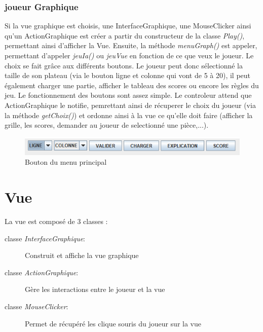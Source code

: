         \subsubsection{joueur Graphique}
        Si la vue graphique est choisis, une InterfaceGraphique, une MouseClicker ainsi qu'un ActionGraphique est créer a partir du constructeur de la classe \textit{Play()}, permettant ainsi d'afficher la Vue. Ensuite, la méthode \textit{menuGraph()} est appeler, permettant d'appeler \textit{jeuIa()} ou \textit{jeuVue} en fonction de ce que veux le joueur. Le choix se fait grâce aux différents boutons. Le joueur peut donc sélectionné la taille de son plateau (via le bouton ligne et colonne qui vont de 5 à 20), il peut également charger une partie, afficher le tableau des scores ou encore les règles du jeu. Le fonctionnement des boutons sont assez simple. Le controleur attend que ActionGraphique le notifie, pemrettant ainsi de récuperer le choix du joueur (via la méthode \textit{getChoix()}) et ordonne ainsi à la vue ce qu'elle doit faire (afficher la grille, les scores, demander au joueur de selectionné une pièce,...).

        \begin{figure}[H]\label{img:joueurGraphqiue}
            \centering
            \includegraphics[scale=0.8]{img/menu.png}
            \caption{Bouton du menu principal}
        \end{figure}


    \section{Vue}
        La vue est composé de 3 classes :
        \begin{description}
            \item[classe \textit{InterfaceGraphique}:]{Construit et affiche la vue graphique }
            \item[classe \textit{ActionGraphique}:]{Gère les interactions entre le joueur et la vue}
            \item[classe \textit{MouseClicker}:]{Permet de récupéré les clique souris du joueur sur la vue}
		\end{description}

